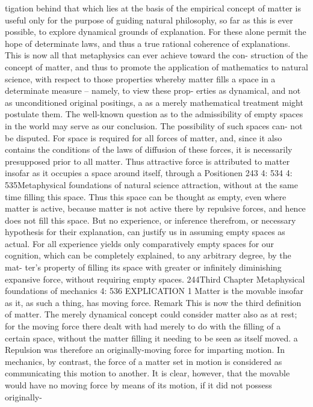 tigation behind that which lies at the basis of the empirical concept of
matter is useful only for the purpose of guiding natural philosophy, so
far as this is ever possible, to explore dynamical grounds of explanation.
For these alone permit the hope of determinate laws, and thus a true
rational coherence of explanations.
This is now all that metaphysics can ever achieve toward the con-
struction of the concept of matter, and thus to promote the application of
mathematics to natural science, with respect to those properties whereby
matter ﬁlls a space in a determinate measure – namely, to view these prop-
erties as dynamical, and not as unconditioned original positings, a as a
merely mathematical treatment might postulate them.
The well-known question as to the admissibility of empty spaces in
the world may serve as our conclusion. The possibility of such spaces can-
not be disputed. For space is required for all forces of matter, and, since
it also contains the conditions of the laws of diffusion of these forces,
it is necessarily presupposed prior to all matter. Thus attractive force is
attributed to matter insofar as it occupies a space around itself, through
a
Positionen
243
4: 534
4: 535Metaphysical foundations of natural science
attraction, without at the same time ﬁlling this space. Thus this space
can be thought as empty, even where matter is active, because matter is
not active there by repulsive forces, and hence does not ﬁll this space.
But no experience, or inference therefrom, or necessary hypothesis for
their explanation, can justify us in assuming empty spaces as actual. For
all experience yields only comparatively empty spaces for our cognition,
which can be completely explained, to any arbitrary degree, by the mat-
ter’s property of ﬁlling its space with greater or inﬁnitely diminishing
expansive force, without requiring empty spaces.
244Third Chapter
Metaphysical foundations of mechanics
4: 536
EXPLICATION 1
Matter is the movable insofar as it, as such a thing, has moving force.
Remark
This is now the third deﬁnition of matter. The merely dynamical concept
could consider matter also as at rest; for the moving force there dealt with
had merely to do with the ﬁlling of a certain space, without the matter
ﬁlling it needing to be seen as itself moved. a Repulsion was therefore an
originally-moving force for imparting motion. In mechanics, by contrast,
the force of a matter set in motion is considered as communicating this
motion to another. It is clear, however, that the movable would have
no moving force by means of its motion, if it did not possess originally-
